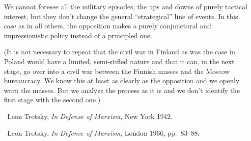 We cannot foresee all the military episodes, the ups and downs of purely tactical interest, but they don’t change the general “strategical” line of events. In this case as in all others, the opposition makes a purely conjunctural and impressionistic policy instead of a principled one.

(It is not necessary to repeat that the civil war in Finland as was the case in Poland would have a limited, semi-stifled nature and that it can, in the next stage, go over into a civil war between the Finnish masses and the Moscow bureaucracy. We know this at least as clearly as the opposition and we openly warn the masses. But we analyze the process as it is and we don’t identify the first stage with the second one.)


\begin{letterinfo}
	\firstpublished\ Leon Trotsky, \emph{In Defense of Marxism}, New York 1942.
	
	\checkedagainst\ Leon Trotsky, \emph{In Defence of Marxism}, London 1966, pp.~83--88.
	
	\footnoteslatter
\end{letterinfo}